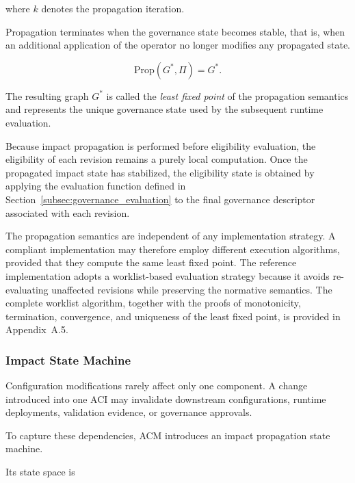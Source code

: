 \documentclass[10pt]{article}
\begin{document}
where $k$ denotes the propagation iteration.

Propagation terminates when the governance state becomes stable, that is, when
an additional application of the operator no longer modifies any propagated
state.

\begin{equation}
	\label{eq:fixed_point}
	\mathrm{Prop}
	\!\left(
	G^{*},
	\Pi
	\right)
	=
	G^{*}.
\end{equation}

The resulting graph $G^{*}$ is called the \emph{least fixed point} of the
propagation semantics and represents the unique governance state used by the
subsequent runtime evaluation.

Because impact propagation is performed before eligibility evaluation,
the eligibility of each revision remains a purely local computation.
Once the propagated impact state has stabilized, the eligibility state is
obtained by applying the evaluation function defined in
Section~\ref{subsec:governance_evaluation} to the final governance descriptor
associated with each revision.

The propagation semantics are independent of any implementation strategy.
A compliant implementation may therefore employ different execution algorithms,
provided that they compute the same least fixed point. The reference
implementation adopts a worklist-based evaluation strategy because it avoids
re-evaluating unaffected revisions while preserving the normative semantics.
The complete worklist algorithm, together with the proofs of monotonicity,
termination, convergence, and uniqueness of the least fixed point, is provided
in Appendix~A.5.







\subsubsection{Impact State Machine}

Configuration modifications rarely affect only one component.
A change introduced into one ACI may invalidate downstream configurations,
runtime deployments, validation evidence, or governance approvals.

To capture these dependencies, ACM introduces an impact propagation state
machine.

Its state space is
\end{document}

